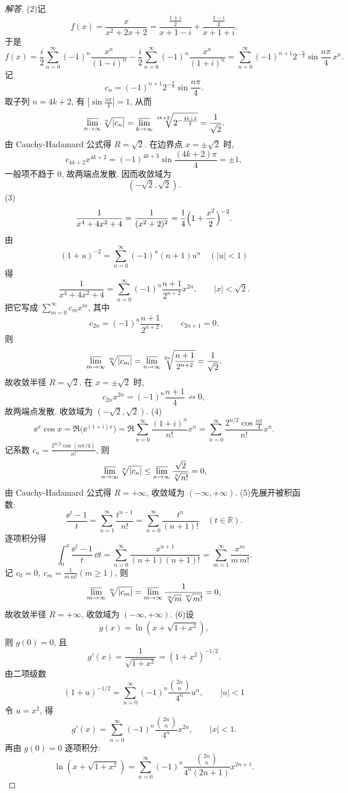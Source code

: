 \begin{quiza}
\begin{enumerate}
\begin{proof}[解答]
(2)记
\[f(x)=\frac{x}{x^2+2x+2}
=\frac{\frac{1+i}{2}}{x+1-i}+\frac{\frac{1-i}{2}}{x+1+i}.\]
于是
\[f(x)=\frac{i}{2}\sum_{n=0}^{\infty}(-1)^n\frac{x^n}{(1-i)^n}
-\frac{i}{2}\sum_{n=0}^{\infty}(-1)^n\frac{x^n}{(1+i)^n}
=\sum_{n=0}^{\infty}(-1)^{n+1}2^{-\frac n2}\sin\frac{n\pi}{4}\,x^n.\]
记
\[c_n=(-1)^{n+1}2^{-\frac n2}\sin\frac{n\pi}{4}.\]
取子列 \(n=4k+2\), 有 \(|\sin\frac{n\pi}{4}|=1\), 从而
\[\varlimsup_{n\to\infty}\sqrt[n]{|c_n|}
=\varlimsup_{k\to\infty}\sqrt[4k+2]{2^{-\frac{4k+2}{2}}}
=\frac{1}{\sqrt2}.\]
由 Cauchy-Hadamard 公式得 \(R=\sqrt2\). 在边界点 \(x=\pm\sqrt2\) 时,
\[c_{4k+2}x^{4k+2}=(-1)^{4k+3}\sin\frac{(4k+2)\pi}{4}=\pm1,\]
一般项不趋于 0, 故两端点发散. 因而收敛域为
\[(-\sqrt2,\sqrt2).\]
(3)\[\frac{1}{x^4+4x^2+4}
=\frac{1}{(x^2+2)^2}
=\frac14\Bigl(1+\frac{x^2}{2}\Bigr)^{-2}.\]
由
\[(1+u)^{-2}=\sum_{n=0}^{\infty}(-1)^n(n+1)u^n\quad(|u|<1)\]
得
\[\frac{1}{x^4+4x^2+4}
=\sum_{n=0}^{\infty}(-1)^n\frac{n+1}{2^{n+2}}x^{2n},
\qquad |x|<\sqrt2.\]
把它写成 \(\sum_{m=0}^{\infty}c_mx^m\), 其中
\[c_{2n}=(-1)^n\frac{n+1}{2^{n+2}},\qquad c_{2n+1}=0.\]
则
\[\varlimsup_{m\to\infty}\sqrt[m]{|c_m|}
=\varlimsup_{n\to\infty}\sqrt[2n]{\frac{n+1}{2^{n+2}}}
=\frac{1}{\sqrt2},\]
故收敛半径 \(R=\sqrt2\). 在 \(x=\pm\sqrt2\) 时,
\[c_{2n}x^{2n}=(-1)^n\frac{n+1}{4}\not\to0,\]
故两端点发散. 收敛域为 \((-\sqrt2,\sqrt2)\).
(4)\[\ee^x\cos x=\Re\bigl(\ee^{(1+i)x}\bigr)
=\Re\sum_{n=0}^{\infty}\frac{(1+i)^n}{n!}x^n
=\sum_{n=0}^{\infty}\frac{2^{n/2}\cos\frac{n\pi}{4}}{n!}x^n.\]
记系数 \(c_n=\frac{2^{n/2}\cos(n\pi/4)}{n!}\), 则
\[\varlimsup_{n\to\infty}\sqrt[n]{|c_n|}
\le \varlimsup_{n\to\infty}\frac{\sqrt2}{\sqrt[n]{n!}}=0,\]
由 Cauchy-Hadamard 公式得 \(R=+\infty\), 收敛域为 \(( -\infty,+\infty)\).
(5)先展开被积函数:
\[\frac{\ee^t-1}{t}
=\sum_{n=1}^{\infty}\frac{t^{n-1}}{n!}
=\sum_{n=0}^{\infty}\frac{t^n}{(n+1)!}
\quad(t\in\mathbb R).\]
逐项积分得
\[\int_0^x\frac{\ee^t-1}{t}\,\dd t
=\sum_{n=0}^{\infty}\frac{x^{n+1}}{(n+1)(n+1)!}
=\sum_{m=1}^{\infty}\frac{x^m}{m\,m!}.\]
记 \(c_0=0,\ c_m=\frac{1}{m\,m!}(m\ge1)\), 则
\[\varlimsup_{m\to\infty}\sqrt[m]{|c_m|}
=\varlimsup_{m\to\infty}\frac{1}{\sqrt[m]{m}\,\sqrt[m]{m!}}=0,\]
故收敛半径 \(R=+\infty\), 收敛域为 \(( -\infty,+\infty)\).
(6)设
\[g(x)=\ln(x+\sqrt{1+x^2}),\]
则 \(g(0)=0\), 且
\[g'(x)=\frac{1}{\sqrt{1+x^2}}=(1+x^2)^{-1/2}.\]
由二项级数
\[(1+u)^{-1/2}=\sum_{n=0}^{\infty}(-1)^n\frac{\binom{2n}{n}}{4^n}u^n,
\qquad |u|<1\]
令 \(u=x^2\), 得
\[g'(x)=\sum_{n=0}^{\infty}(-1)^n\frac{\binom{2n}{n}}{4^n}x^{2n},
\qquad |x|<1.\]
再由 \(g(0)=0\) 逐项积分:
\[\ln(x+\sqrt{1+x^2})
=\sum_{n=0}^{\infty}(-1)^n\frac{\binom{2n}{n}}{4^n(2n+1)}x^{2n+1}.\]

\end{proof}
\end{enumerate}
\end{quiza}

